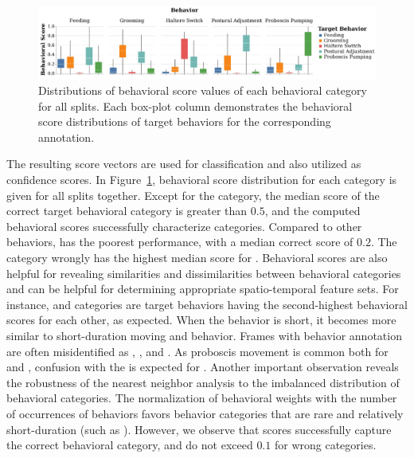 \begin{figure}[htb!]
	\centering
	\includegraphics[width=\linewidth]{figures/BehavioralScoresDistributions_perBehavior.pdf}
	\caption[Distributions of behavioral score values of each behavioral category for all splits together.]{Distributions of behavioral score values of each behavioral category for all splits.
		Each box-plot column demonstrates the behavioral score distributions of target behaviors for the corresponding annotation.\label{figure:behavioral-score-distributions}}
\end{figure}

The resulting score vectors are used for classification and also utilized as confidence scores.
In Figure~\ref{figure:behavioral-score-distributions}, behavioral score distribution for each category is given for all splits together.
Except for the \Feeding category, the median score of the correct target behavioral category is greater than $0.5$, and the computed behavioral scores successfully characterize categories.
Compared to other behaviors, \Feeding has the poorest performance, with a median correct score of $0.2$.
The \PosturalAdjustment category wrongly has the highest median score for \Feeding.
Behavioral scores are also helpful for revealing similarities and dissimilarities between behavioral categories and can be helpful for determining appropriate spatio-temporal feature sets.
For instance, \Grooming and \PosturalAdjustment categories are target behaviors having the second-highest behavioral scores for each other, as expected.
When the \Grooming behavior is short, it becomes more similar to short-duration moving and \PosturalAdjustment behavior.
Frames with \Feeding behavior annotation are often misidentified as \PosturalAdjustment, \Grooming, and \ProboscisPumping.
As proboscis movement is common both for \Feeding and \ProboscisPumping, confusion with the \ProboscisPumping is expected for \Feeding.
Another important observation reveals the robustness of the nearest neighbor analysis to the imbalanced distribution of behavioral categories.
The normalization of behavioral weights with the number of occurrences of behaviors favors behavior categories that are rare and relatively short-duration (such as \HaltereSwitch). However, we observe that \HaltereSwitch scores successfully capture the correct behavioral category, and do not exceed $0.1$ for wrong categories.

